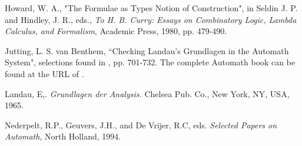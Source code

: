 \documentclass[12pt]{article}
\begin{document}
\begin{thebibliography}{99}
 Howard, W. A., "The Formulae as Types Notion of Construction", in Seldin J. P. and Hindley, J. R., eds., {\em To H. B. Curry:  Essays on Combinatory Logic, Lambda Calculus, and Formalism}, Academic Press, 1980, pp. 479-490.

 Jutting, L. S. van Benthem, ``Checking Landau's Grundlagen in the Automath System", selections found in \cite{automathbook}, pp. 701-732.    The complete Automath book can be found at the URL of  \cite{freek}.

   Landau, E,. {\em Grundlagen der Analysis.\/} Chelsea Pub. Co., New
York, NY, USA, 1965.

 Nederpelt, R.P., Geuvers, J.H., and De Vrijer, R.C, eds. {\em Selected Papers on Automath}, North Holland, 1994.



\end{thebibliography}
\end{document}
